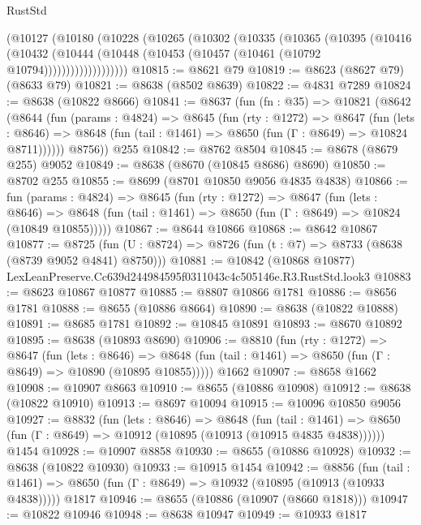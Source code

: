 \begin{lexlean}{RustStd}
\begin{coremodule}
          (@10127
            (@10180
              (@10228
                (@10265
                  (@10302
                    (@10335
                      (@10365
                        (@10395
                          (@10416
                            (@10432
                              (@10444
                                (@10448 (@10453 (@10457 (@10461 (@10792 @10794)))))))))))))))))))
@10815 := @8621 @79
@10819 := @8623 (@8627 @79) (@8633 @79)
@10821 := @8638 (@8502 @8639)
@10822 := @4831 @7289
@10824 := @8638 (@10822 @8666)
@10841 := @8637
    (fun (fn : @35) =>
    @10821
      (@8642
        (@8644
          (fun (params : @4824) =>
          @8645
            (fun (rty : @1272) =>
            @8647
              (fun (lets : @8646) =>
              @8648 (fun (tail : @1461) => @8650 (fun (Γ : @8649) => @10824 @8711))))))
        @8756))
    @255
@10842 := @8762 @8504
@10845 := @8678 (@8679 @255) @9052
@10849 := @8638 (@8670 (@10845 @8686) @8690)
@10850 := @8702 @255
@10855 := @8699 (@8701 @10850 @9056 @4835 @4838)
@10866 := fun (params : @4824) =>
  @8645
    (fun (rty : @1272) =>
    @8647
      (fun (lets : @8646) =>
      @8648 (fun (tail : @1461) => @8650 (fun (Γ : @8649) => @10824 (@10849 @10855)))))
@10867 := @8644 @10866
@10868 := @8642 @10867
@10877 := @8725 (fun (U : @8724) => @8726 (fun (t : @7) => @8733 (@8638 (@8739 @9052 @4841) @8750)))
@10881 := @10842 (@10868 @10877) LexLeanPreserve.Cc639d244984595f0311043c4c505146e.R3.RustStd.look3
@10883 := @8623 @10867 @10877
@10885 := @8807 @10866 @1781
@10886 := @8656 @1781
@10888 := @8655 (@10886 @8664)
@10890 := @8638 (@10822 @10888)
@10891 := @8685 @1781
@10892 := @10845 @10891
@10893 := @8670 @10892
@10895 := @8638 (@10893 @8690)
@10906 := @8810
    (fun (rty : @1272) =>
    @8647
      (fun (lets : @8646) =>
      @8648 (fun (tail : @1461) => @8650 (fun (Γ : @8649) => @10890 (@10895 @10855)))))
    @1662
@10907 := @8658 @1662
@10908 := @10907 @8663
@10910 := @8655 (@10886 @10908)
@10912 := @8638 (@10822 @10910)
@10913 := @8697 @10094
@10915 := @10096 @10850 @9056
@10927 := @8832
    (fun (lets : @8646) =>
    @8648
      (fun (tail : @1461) =>
      @8650 (fun (Γ : @8649) => @10912 (@10895 (@10913 (@10915 @4835 @4838))))))
    @1454
@10928 := @10907 @8858
@10930 := @8655 (@10886 @10928)
@10932 := @8638 (@10822 @10930)
@10933 := @10915 @1454
@10942 := @8856
    (fun (tail : @1461) => @8650 (fun (Γ : @8649) => @10932 (@10895 (@10913 (@10933 @4838)))))
    @1817
@10946 := @8655 (@10886 (@10907 (@8660 @1818)))
@10947 := @10822 @10946
@10948 := @8638 @10947
@10949 := @10933 @1817

\end{coremodule}
\end{lexlean}
